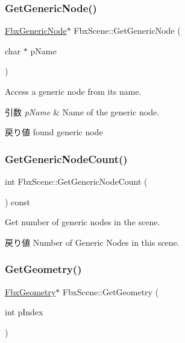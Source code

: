 \subsubsection{\texorpdfstring{Get\+Generic\+Node()}{GetGenericNode()}\hspace{0.1cm}{\footnotesize\ttfamily [2/2]}}
{\footnotesize\ttfamily \hyperlink{class_fbx_generic_node}{Fbx\+Generic\+Node}$\ast$ Fbx\+Scene\+::\+Get\+Generic\+Node (\begin{DoxyParamCaption}\item[{char $\ast$}]{p\+Name }\end{DoxyParamCaption})}

Access a generic node from its name. 
\begin{DoxyParams}{引数}
{\em p\+Name} & Name of the generic node. \\
\hline
\end{DoxyParams}
\begin{DoxyReturn}{戻り値}
found generic node 
\end{DoxyReturn}
\mbox{\label{class_fbx_scene_affc3c8713672b7d0c3bf857a62cb400b}} 
\subsubsection{\texorpdfstring{Get\+Generic\+Node\+Count()}{GetGenericNodeCount()}}
{\footnotesize\ttfamily int Fbx\+Scene\+::\+Get\+Generic\+Node\+Count (\begin{DoxyParamCaption}{ }\end{DoxyParamCaption}) const}

Get number of generic nodes in the scene. \begin{DoxyReturn}{戻り値}
Number of Generic Nodes in this scene. 
\end{DoxyReturn}
\mbox{\label{class_fbx_scene_a66fc27092b1511bc91bb8c73352b066c}} 
\subsubsection{\texorpdfstring{Get\+Geometry()}{GetGeometry()}}
{\footnotesize\ttfamily \hyperlink{class_fbx_geometry}{Fbx\+Geometry}$\ast$ Fbx\+Scene\+::\+Get\+Geometry (\begin{DoxyParamCaption}\item[{int}]{p\+Index }\end{DoxyParamCaption})}

